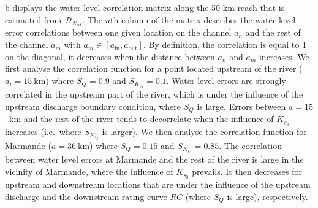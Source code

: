 b displays the water level correlation matrix along the 50 km reach that is estimated from $\mathcal{D}_{N_{\text{ref}}}$. The $n$th column of the matrix describes the water level error correlations between one given location on the channel $a_n$ and the rest of the channel $a_m$ with $a_m \in [a_{\text{in}}, a_{\text{out}}]$. By definition, the correlation is equal to 1 on the diagonal, it decreases when the distance between $a_n$ and $a_m$ increases. We first analyse the correlation function for a point located upstream of the river ($a_i = 15~\text{km}$) where $S_Q = 0.9$ and $S_{K_{s_3}}= 0.1$. Water level errors are strongly correlated in the upstream part of the river, which is under the influence of the upstream discharge boundary condition, where $S_Q$ is large. Errors between $a = 15$~km and the rest of the river tends to decorrelate when the influence of $K_{s_3}$ increases (i.e.~where $S_{K_{s_3}}$ is larger). We then analyse the correlation function for Marmande ($a = 36~\text{km}$) where $S_Q= 0.15$ and $S_{K_{s_3}}= 0.85$. The correlation between water level errors at Marmande and the rest of the river is large in the vicinity of Marmande, where the influence of $K_{s_3}$ prevails. It then decreases for upstream and downstream locations that are under the influence of the upstream discharge and the downstream rating curve $RC$ (where $S_Q$ is large), respectively.
